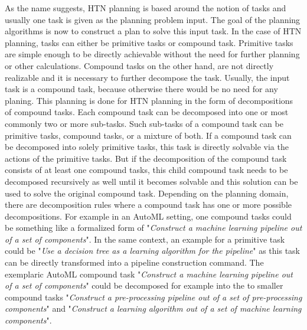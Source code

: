 As the name suggests, HTN planning is based around the notion of tasks and usually one task is given as the planning problem input.
The goal of the planning algorithms is now to construct a plan to solve this input task.
In the case of HTN planning, tasks can either be primitive tasks or compound task.\newline
Primitive tasks are simple enough to be directly achievable without the need for further planning or other calculations.
Compound tasks on the other hand, are not directly realizable and it is necessary to further decompose the task.
Usually, the input task is a compound task, because otherwise there would be no need for any planing.
This planning is done for HTN planning in the form of decompositions of compound tasks.\newline
Each compound task can be decomposed into one or most commonly two or more sub-tasks.
Such sub-tasks of a compound task can be primitive tasks, compound tasks, or a mixture of both.
If a compound task can be decomposed into solely primitive tasks, this task is directly solvable via the actions of the primitive tasks.
But if the decomposition of the compound task consists of at least one compound tasks, this child compound task needs to be decomposed recursively as well until it becomes solvable and this solution can be used to solve the original compound task.
Depending on the planning domain, there are decomposition rules where a compound task has one or more possible decompositions.\newline
For example in an AutoML setting, one compound tasks could be something like a formalized form of "\textit{Construct a machine learning pipeline out of a set of components}".
In the same context, an example for a primitive task could be "\textit{Use a decision tree as a learning algorithm for the pipeline}" as this task can be directly transformed into a pipeline construction command.
The exemplaric AutoML compound task "\textit{Construct a machine learning pipeline out of a set of components}" could be decomposed for example into the to smaller compound tasks "\textit{Construct a pre-processing pipeline out of a set of pre-processing components}" and "\textit{Construct a learning algorithm out of a set of machine learning components}".

